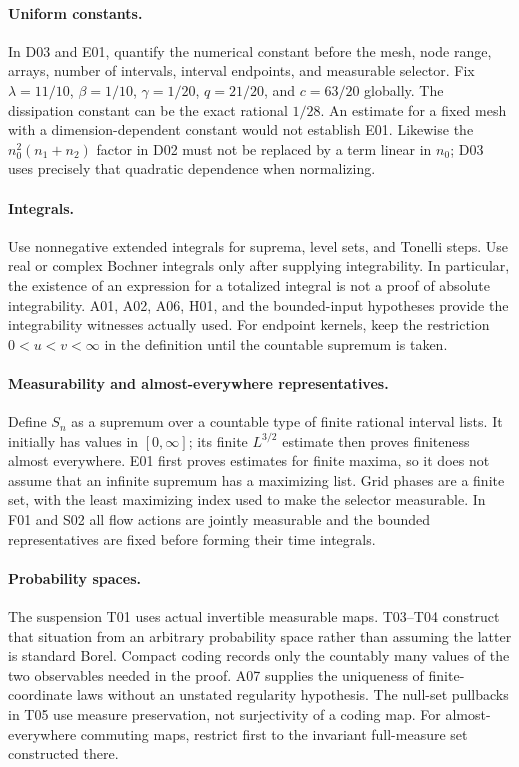 \documentclass[11pt]{article}
\theoremstyle{remark}\newtheorem{remark}[theorem]{Remark}
\begin{document}
\paragraph{Uniform constants.}
In D03 and E01, quantify the numerical constant before the mesh, node range, arrays, number of intervals, interval endpoints, and measurable selector. Fix $\lambda=11/10$, $\beta=1/10$, $\gamma=1/20$, $q=21/20$, and $c=63/20$ globally. The dissipation constant can be the exact rational $1/28$. An estimate for a fixed mesh with a dimension-dependent constant would not establish E01. Likewise the $n_0^2(n_1+n_2)$ factor in D02 must not be replaced by a term linear in $n_0$; D03 uses precisely that quadratic dependence when normalizing.

\paragraph{Integrals.}
Use nonnegative extended integrals for suprema, level sets, and Tonelli steps. Use real or complex Bochner integrals only after supplying integrability. In particular, the existence of an expression for a totalized integral is not a proof of absolute integrability. A01, A02, A06, H01, and the bounded-input hypotheses provide the integrability witnesses actually used. For endpoint kernels, keep the restriction $0<u<v<\infty$ in the definition until the countable supremum is taken.

\paragraph{Measurability and almost-everywhere representatives.}
Define $S_n$ as a supremum over a countable type of finite rational interval lists. It initially has values in $[0,\infty]$; its finite $L^{3/2}$ estimate then proves finiteness almost everywhere. E01 first proves estimates for finite maxima, so it does not assume that an infinite supremum has a maximizing list. Grid phases are a finite set, with the least maximizing index used to make the selector measurable. In F01 and S02 all flow actions are jointly measurable and the bounded representatives are fixed before forming their time integrals.

\paragraph{Probability spaces.}
The suspension T01 uses actual invertible measurable maps. T03--T04 construct that situation from an arbitrary probability space rather than assuming the latter is standard Borel. Compact coding records only the countably many values of the two observables needed in the proof. A07 supplies the uniqueness of finite-coordinate laws without an unstated regularity hypothesis. The null-set pullbacks in T05 use measure preservation, not surjectivity of a coding map. For almost-everywhere commuting maps, restrict first to the invariant full-measure set constructed there.
\end{document}
